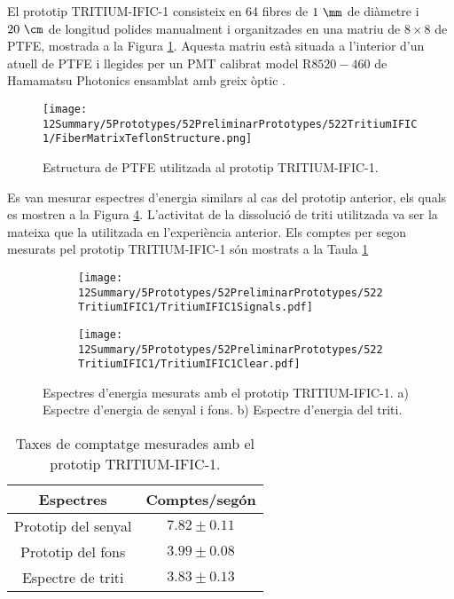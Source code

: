 El prototip TRITIUM-IFIC-1 consisteix en 64 fibres de $1~\mm$ de diàmetre i $20~\cm$ de longitud polides manualment i organitzades en una matriu de $8\times 8$ de PTFE, mostrada a la Figura \ref{fig:EstructuraPTFEFibresTritiumIFIC1}. Aquesta matriu està situada a l'interior d'un atuell de PTFE i llegides per un PMT calibrat model R$8520-460$ de Hamamatsu Photonics \cite{DataSheetPMTs} ensamblat amb greix òptic \cite{OpticalGrease}.

\begin{figure}[h]
\centering
\texttt{[image: 12Summary/5Prototypes/52PreliminarPrototypes/522TritiumIFIC1/FiberMatrixTeflonStructure.png]}
\caption{Estructura de PTFE utilitzada al prototip TRITIUM-IFIC-1.\label{fig:EstructuraPTFEFibresTritiumIFIC1}}
\end{figure}

Es van mesurar espectres d'energia similars al cas del prototip anterior, els quals es mostren a la Figura \ref{fig:EspectresEnergeticsTRITIUMIFIC1}. L'activitat de la dissolució de triti utilitzada va ser la mateixa que la utilitzada en l'experiència anterior. Els comptes per segon mesurats pel prototip TRITIUM-IFIC-1 són mostrats a la Taula \ref{tab:ContesPerSegonTRITIUMIFIC1}

\begin{figure}
\centering
    \begin{subfigure}[b]{1\textwidth}
    \centering
    \texttt{[image: 12Summary/5Prototypes/52PreliminarPrototypes/522TritiumIFIC1/TritiumIFIC1Signals.pdf]}  
    \caption{\label{subfig:EspectreEnergeticSenyalFonsTritiumIFIC1}}
    \end{subfigure}
    \hfill
    \begin{subfigure}[b]{1\textwidth}
    \centering
    \texttt{[image: 12Summary/5Prototypes/52PreliminarPrototypes/522TritiumIFIC1/TritiumIFIC1Clear.pdf]}  
    \caption{\label{subfig:EspectreEnergeticTritiTritiumIFIC1}}
    \end{subfigure}
 \caption{Espectres d'energia mesurats amb el prototip TRITIUM-IFIC-1. a) Espectre d'energia de senyal i fons. b) Espectre d'energia del triti.}
 \label{fig:EspectresEnergeticsTRITIUMIFIC1}
\end{figure}

\begin{table}[htbp]
\centering{}%
\begin{tabular}{cc}
\toprule 
Espectres & Comptes/segón  \tabularnewline
\midrule
\midrule 
Prototip del senyal & $7.82 \pm 0.11$ \tabularnewline
Prototip del fons & $3.99 \pm 0.08$ \tabularnewline  
Espectre de triti & $3.83 \pm 0.13$ \tabularnewline
\bottomrule
\end{tabular}
\caption{Taxes de comptatge mesurades amb el prototip TRITIUM-IFIC-1.}
\label{tab:ContesPerSegonTRITIUMIFIC1}
\end{table}


